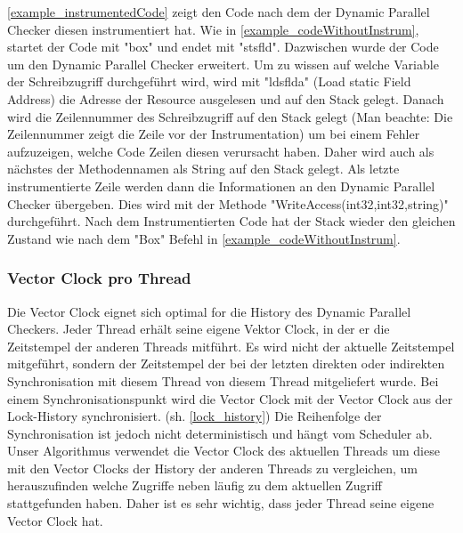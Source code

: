 \documentclass[10pt,a4paper]{article}
\begin{document}
\begin{flushleft}
\begin{figure}[H]
\end{figure}
\autoref{example_instrumentedCode} zeigt den Code nach dem der Dynamic Parallel Checker diesen instrumentiert hat. Wie in \autoref{example_codeWithoutInstrum}, startet der Code mit "box" und endet mit "stsfld". Dazwischen wurde der Code um den Dynamic Parallel Checker erweitert. Um zu wissen auf welche Variable der Schreibzugriff durchgeführt wird, wird mit "ldsflda" (Load static Field Address) die Adresse der Resource ausgelesen und auf den Stack gelegt. Danach wird die Zeilennummer des Schreibzugriff auf den Stack gelegt (Man beachte: Die Zeilennummer zeigt die Zeile vor der Instrumentation) um bei einem Fehler aufzuzeigen, welche Code Zeilen diesen verursacht haben. Daher wird auch als nächstes der Methodennamen als String auf den Stack gelegt. Als letzte instrumentierte Zeile werden dann die Informationen an den Dynamic Parallel Checker übergeben. Dies wird mit der Methode "WriteAccess(int32,int32,string)" durchgeführt. Nach dem Instrumentierten Code hat der Stack wieder den gleichen Zustand wie nach dem "Box" Befehl in \autoref{example_codeWithoutInstrum}.
\end{flushleft}
\subsubsection{Vector Clock pro Thread}
\begin{flushleft}
Die Vector Clock eignet sich optimal for die History des Dynamic Parallel Checkers. Jeder Thread erhält seine eigene Vektor Clock, in der er die Zeitstempel der anderen Threads mitführt. Es wird nicht der aktuelle Zeitstempel mitgeführt, sondern der Zeitstempel der bei der letzten direkten oder indirekten Synchronisation mit diesem Thread von diesem Thread mitgeliefert wurde. Bei einem Synchronisationspunkt wird die Vector Clock mit der Vector Clock aus der Lock-History synchronisiert. (sh. \ref{lock_history}) Die Reihenfolge der Synchronisation ist jedoch nicht deterministisch und hängt vom Scheduler ab.\\
Unser Algorithmus verwendet die Vector Clock des aktuellen Threads um diese mit den Vector Clocks der History der anderen Threads zu vergleichen, um herauszufinden welche Zugriffe neben läufig zu dem aktuellen Zugriff stattgefunden haben. Daher ist es sehr wichtig, dass jeder Thread seine eigene Vector Clock hat.
\end{flushleft}
\end{document}
